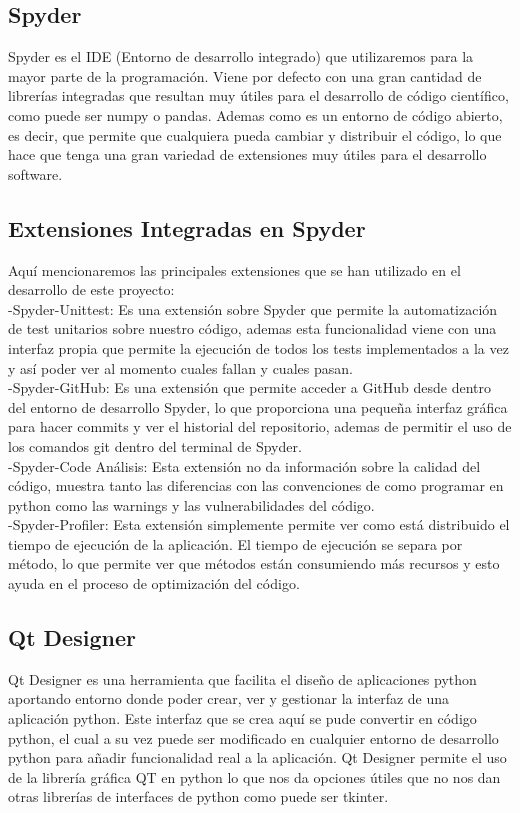 \documentclass[12pt,a4paper]{article}
\begin{document}
\subsection{Spyder}
Spyder es el IDE (Entorno de desarrollo integrado) que utilizaremos para la mayor parte de la programación. Viene por defecto con una gran cantidad de librerías integradas que resultan muy útiles para el desarrollo de código científico, como puede ser numpy o pandas. Ademas como es un entorno de código abierto, es decir, que permite que cualquiera pueda cambiar y distribuir el código, lo que hace que tenga una gran variedad de extensiones muy útiles para el desarrollo software.\\
\subsection{Extensiones Integradas en Spyder}
Aquí mencionaremos las principales extensiones que se han utilizado en el desarrollo de este proyecto:\\
-Spyder-Unittest: Es una extensión sobre Spyder que permite la automatización de test unitarios sobre nuestro código, ademas esta funcionalidad viene con una interfaz propia que permite la ejecución de todos los tests implementados a la vez y así poder ver al momento cuales fallan y cuales pasan.\\
-Spyder-GitHub: Es una extensión que permite acceder a GitHub desde dentro del entorno de desarrollo Spyder, lo que proporciona una pequeña interfaz gráfica para hacer commits y ver el historial del repositorio, ademas de permitir el uso de los comandos git dentro del terminal de Spyder.\\
-Spyder-Code Análisis: Esta extensión no da información sobre la calidad del código, muestra tanto las diferencias con las convenciones de como programar en python como las warnings y las vulnerabilidades del código.\\
-Spyder-Profiler: Esta extensión simplemente permite ver como está distribuido el tiempo de ejecución de la aplicación. El tiempo de ejecución se separa por método, lo que permite ver que métodos están consumiendo más recursos y esto ayuda en el proceso de optimización del código.\\
\subsection{Qt Designer}
Qt Designer es una herramienta que facilita el diseño de aplicaciones python aportando entorno donde poder crear, ver y gestionar la interfaz de una aplicación python. Este interfaz que se crea aquí se pude convertir en código python, el cual a su vez puede ser modificado en cualquier entorno de desarrollo python para añadir funcionalidad real a la aplicación. Qt Designer permite el uso de la librería gráfica QT en python lo que nos da opciones útiles que no nos dan otras librerías de interfaces de python como puede ser tkinter.\\
\end{document}
